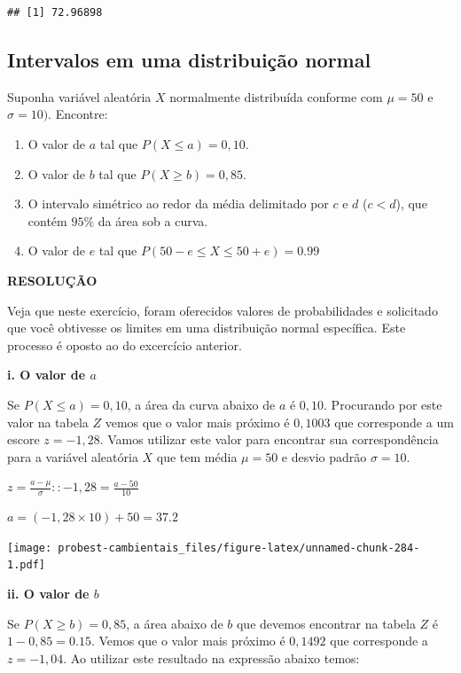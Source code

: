 \documentclass[
]{book}
\providecommand{\tightlist}{%
  \setlength{\itemsep}{0pt}\setlength{\parskip}{0pt}}
\begin{document}
\begin{verbatim}
## [1] 72.96898
\end{verbatim}

\hypertarget{intervalos-em-uma-distribuiuxe7uxe3o-normal}{%
\subsection{Intervalos em uma distribuição normal}\label{intervalos-em-uma-distribuiuxe7uxe3o-normal}}

Suponha variável aleatória \(X\) normalmente distribuída conforme com \(\mu = 50\) e \(\sigma = 10)\). Encontre:

\begin{enumerate}
\def\labelenumi{\roman{enumi}.}
\tightlist
\item
  O valor de \(a\) tal que \(P(X \le a) = 0,10\).
\item
  O valor de \(b\) tal que \(P(X \ge b) = 0,85\).
\item
  O intervalo simétrico ao redor da média delimitado por \(c\) e \(d\) (\(c < d\)), que contém \(95\%\) da área sob a curva.
\item
  O valor de \(e\) tal que \(P(50-e \le X \le 50+e) = 0.99\)
\end{enumerate}

\textbf{RESOLUÇÃO}

Veja que neste exercício, foram oferecidos valores de probabilidades e solicitado que você obtivesse os limites em uma distribuição normal específica. Este processo é oposto ao do excercício anterior.

\textbf{i. O valor de \(a\)}

Se \(P(X \le a) = 0,10\), a área da curva abaixo de \(a\) é \(0,10\). Procurando por este valor na tabela \(Z\) vemos que o valor mais próximo é \(0,1003\) que corresponde a um escore \(z = -1,28\). Vamos utilizar este valor para encontrar sua correspondência para a variável aleatória \(X\) que tem média \(\mu = 50\) e desvio padrão \(\sigma = 10\).

\(z = \frac{a - \mu}{\sigma} :: -1,28 = \frac{a - 50}{10}\)

\(a = (-1,28 \times 10) + 50 = 37.2\)

\texttt{[image: probest-cambientais\_files/figure-latex/unnamed-chunk-284-1.pdf]}

\textbf{ii. O valor de \(b\)}

Se \(P(X \ge b) = 0,85\), a área abaixo de \(b\) que devemos encontrar na tabela \(Z\) é \(1 - 0,85 = 0.15\). Vemos que o valor mais próximo é \(0,1492\) que corresponde a \(z = -1,04\). Ao utilizar este resultado na expressão abaixo temos:
\end{document}
